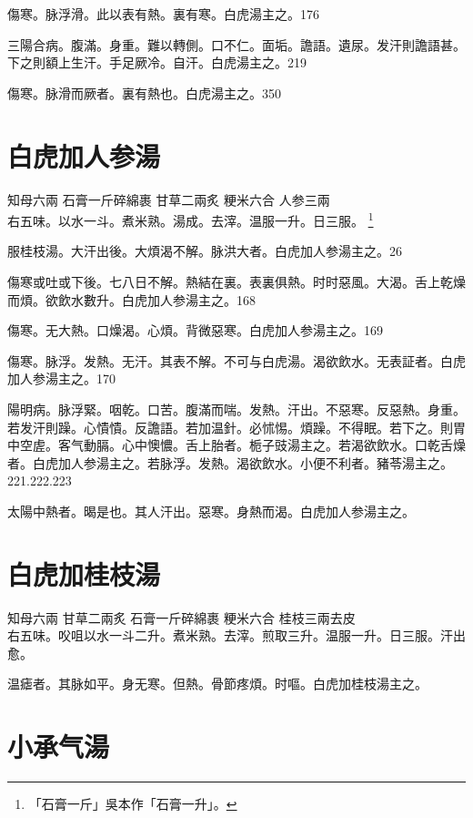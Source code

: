 傷寒。脉浮滑。此以表有熱。裏有寒。白虎湯主之。176

三陽合病。腹滿。身重。難以轉側。口不仁。面垢。譫語。遺尿。发汗則譫語{\khaaitp 甚}。下之則額上生汗。手足厥冷。自汗。白虎湯主之。219

傷寒。脉滑而厥者。裏有熱也。白虎湯主之。350

\section{白虎加人参湯}

知母{\scriptsize 六兩} 石膏{\scriptsize 一斤碎綿裹} 甘草{\scriptsize 二兩炙} 粳米{\scriptsize 六合} 人参{\scriptsize 三兩}\\
右五味。以水一斗。煮米熟。湯成。去滓。温服一升。日三服。
	\footnote{
	「石膏一斤」吳本作「石膏一升」。
	}

服桂枝湯。大汗出{\khaaitp 後}。大煩渴不解。脉洪大者。白虎{\khaaitp 加人参}湯主之。26

傷寒或吐或下後。七八日不解。熱結在裏。表裏俱熱。时时惡風。大渴。舌上乾燥而煩。欲飲水數升。白虎{\khaaitp 加人参}湯主之。168

傷寒。无大熱。口燥渴。心煩。背微惡寒。白虎{\khaaitp 加人参}湯主之。169

傷寒。脉浮。发熱。无汗。其表不解。不可与白虎湯。渴欲飲水。无表証者。白虎{\khaaitp 加人参}湯主之。170

陽明病。脉浮緊。咽乾。口苦。腹滿而喘。发熱。汗出。不惡寒。反惡熱。身重。若发汗則躁。心憒憒。反譫語。若加温針。必怵惕。煩躁。不得眠。若下之。則胃中空虗。客气動膈。心中懊憹。舌上胎者。栀子{\khaaitp 豉}湯主之。若渴欲飲水。口乾舌燥者。白虎{\khaaitp 加人参}湯主之。若脉浮。发熱。渴欲飲水。小便不利者。豬苓湯主之。221.222.223

太陽中熱者。暍是也。其人汗出。惡寒。身熱而渴。白虎{\khaaitp 加人参}湯主之。

\section{白虎加桂枝湯}

知母{\scriptsize 六兩} 甘草{\scriptsize 二兩炙} 石膏{\scriptsize 一斤碎綿裹} 粳米{\scriptsize 六合} 桂枝{\scriptsize 三兩去皮}\\
右五味。㕮咀以水一斗二升。煮米熟。去滓。煎取三升。温服一升。日三服。汗出愈。

温瘧者。其脉如平。身无寒。但熱。骨節疼煩。时嘔。白虎加桂枝湯主之。

\section{小承气湯}

